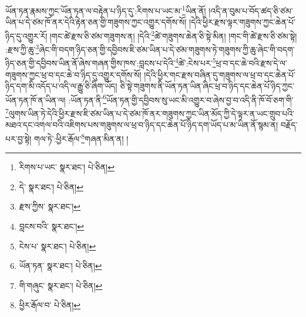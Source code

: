 ཡོན་ཏན་རྣམས་ཀྱང་ཡོན་ཏན་ལ་བརྟེན་པ་ཉིད་དུ་:རིགས་པ་ཡང་མ་\footnote{རིགས་པ་ཡང་  སྣར་ཐང་།  པེ་ཅིན། }ཡིན་ནོ། །འདི་ན་བུམ་པ་བོད་ཚད་ཅི་ཙམ་ཡིན་པ་དེ་ཙམ་ཁོ་ནར་དེའི་རྟེན་ཅན་གྱི་གཟུགས་ཀྱང་འགྱུར་དགོས་སོ། །དེའི་ཕྱིར་རྫས་ལྟར་གཟུགས་ཀྱང་ཆེན་པོ་ཉིད་དུ་འགྱུར་རོ། །གང་ཚེ་རྫས་ཅི་ཙམ་གཟུགས་ན། །དེའི་\footnote{དེ་  སྣར་ཐང་།  པེ་ཅིན། }ཚེ་གཟུགས་ཆེན་ཅི་སྟེ་མིན། །གང་གི་ཚེ་རྫས་ཅི་ཙམ་སྟེ། :རྫས་ཀྱི་ཆུ་\footnote{རྫས་ཀྱིས་  སྣར་ཐང་། }ཞེང་གི་བདག་ཉིད་ཅན་གྱི་དབྱིབས་ཇི་ཙམ་ཡིན་པ་དེ་ཙམ་གཟུགས་ཏེ་གཟུགས་ཀྱི་ཆུ་ཞེང་གི་བདག་ཉིད་ཅན་གྱི་དབྱིབས་ཡིན་ནོ་ཞེས་གཞན་གྱིས་ཁས་:བླངས་པ་དེའི་\footnote{བླངས་བའི་  སྣར་ཐང་། }ཚེ་:ངེས་པར་\footnote{ངེས་པ་  སྣར་ཐང་།  པེ་ཅིན། }ཕྲ་བ་དང་ཆེ་བའི་རྫས་དེ་ལ་གཟུགས་ཀྱང་ཕྲ་བ་དང་ཆེ་བ་ཉིད་དུ་འགྱུར་དགོས་སོ། །དེའི་ཕྱིར་གང་རྫས་བཞིན་དུ་གཟུགས་ལ་ཕྲ་བ་དང་ཆེན་པོ་ཉིད་དག་མི་འདོད་པ་འདི་ལ་རྒྱུ་ཅི་ཞིག་ཡོད། ཅི་སྟེ་གཟུགས་ནི་ཡོན་ཏན་ཡིན་ཞིང་ཕྲ་བ་ཉིད་དང་ཆེན་པོ་ཉིད་ཀྱང་ཡོན་ཏན་ཁོ་ན་ཡིན་ལ། :ཡོན་ཏན་ནི་\footnote{ཡོན་ཏན་  སྣར་ཐང་།  པེ་ཅིན། }ཡོན་ཏན་གྱི་དབྱིབས་སུ་ཡང་མི་འགྱུར་བ་ཞེས་བྱ་བ་འདི་ནི་ཁོ་བོ་ཅག་གི་\footnote{གི་གཞུང་  སྣར་ཐང་།  པེ་ཅིན། }ལུགས་ཡིན་ཏེ་དེའི་ཕྱིར་རྫས་ཇི་ཙམ་ཡིན་པ་དེ་ཙམ་ཁོ་ནར་གཟུགས་ཀྱང་ཡིན་མོད་ཀྱི་དེ་ལྟར་ན་ཡང་གྲུབ་པའི་མཐའ་དང་འགལ་བའི་འཇིགས་པས་གཟུགས་ལ་ཕྲ་བ་ཉིད་དང་ཆེན་པོ་ཉིད་དག་ཡོད་པ་མ་ཡིན་ནོ་སྙམ་ན། བརྗོད་པར་བྱ་སྟེ། གལ་ཏེ་:ཕྱིར་རྒོལ་\footnote{ཕྱིར་རྒོལ་བ་  པེ་ཅིན། }གཞན་མིན་ན། །
